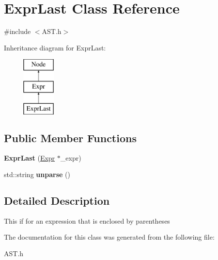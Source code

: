 \hypertarget{classExprLast}{\section{Expr\-Last Class Reference}
\label{classExprLast}
}


{\ttfamily \#include $<$A\-S\-T.\-h$>$}

Inheritance diagram for Expr\-Last\-:\begin{figure}[H]
\begin{center}
\leavevmode
\includegraphics[height=3.000000cm]{classExprLast}
\end{center}
\end{figure}
\subsection*{Public Member Functions}
\begin{DoxyCompactItemize}
\item 
\hypertarget{classExprLast_a361aa1ee38ea15128c7a87f0a2c38925}{{\bfseries Expr\-Last} (\hyperlink{classExpr}{Expr} $\ast$\-\_\-expr)}\label{classExprLast_a361aa1ee38ea15128c7a87f0a2c38925}

\item 
\hypertarget{classExprLast_a038e60a9df13a5d88ee8216b32a70d5c}{std\-::string {\bfseries unparse} ()}\label{classExprLast_a038e60a9df13a5d88ee8216b32a70d5c}

\end{DoxyCompactItemize}


\subsection{Detailed Description}
This if for an expression that is enclosed by parentheses 

The documentation for this class was generated from the following file\-:\begin{DoxyCompactItemize}
\item 
A\-S\-T.\-h\end{DoxyCompactItemize}
